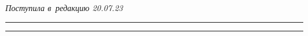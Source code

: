 










\vspace*{-6pt}





\hfill{\small\textit{Поступила в~редакцию 20.07.23}}





\vspace*{8pt}





\hrule





\vspace*{2pt}











\hrule





\vspace*{8pt}















\def\tit{CLASS IMBALANCE IN~THE~TECHNOLOGY\\ OF~CONCRETE HISTORICAL 


INVESTIGATION SUPPORT}











\def\titkol{Class imbalance in~the~technology of~concrete historical 


investigation support}





\def\aut{I.\,M.~Adamovich and O.\,I.~Volkov}





